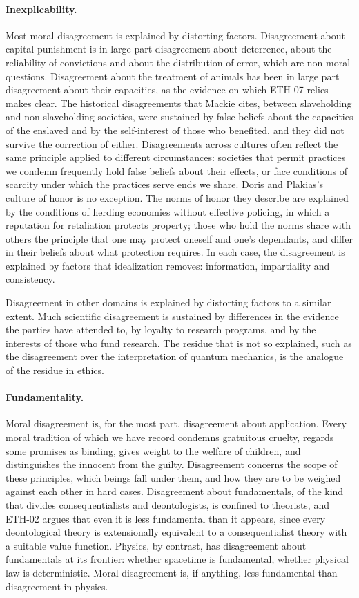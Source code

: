 \documentclass{situationist-preprint}
\begin{document}
\paragraph{Inexplicability.} Most moral disagreement is explained by distorting factors. Disagreement about capital punishment is in large part disagreement about deterrence, about the reliability of convictions and about the distribution of error, which are non-moral questions. Disagreement about the treatment of animals has been in large part disagreement about their capacities, as the evidence on which ETH-07 relies makes clear. The historical disagreements that Mackie cites, between slaveholding and non-slaveholding societies, were sustained by false beliefs about the capacities of the enslaved and by the self-interest of those who benefited, and they did not survive the correction of either. Disagreements across cultures often reflect the same principle applied to different circumstances: societies that permit practices we condemn frequently hold false beliefs about their effects, or face conditions of scarcity under which the practices serve ends we share. Doris and Plakias's culture of honor is no exception. The norms of honor they describe are explained by the conditions of herding economies without effective policing, in which a reputation for retaliation protects property; those who hold the norms share with others the principle that one may protect oneself and one's dependants, and differ in their beliefs about what protection requires. In each case, the disagreement is explained by factors that idealization removes: information, impartiality and consistency.

Disagreement in other domains is explained by distorting factors to a similar extent. Much scientific disagreement is sustained by differences in the evidence the parties have attended to, by loyalty to research programs, and by the interests of those who fund research. The residue that is not so explained, such as the disagreement over the interpretation of quantum mechanics, is the analogue of the residue in ethics.

\paragraph{Fundamentality.} Moral disagreement is, for the most part, disagreement about application. Every moral tradition of which we have record condemns gratuitous cruelty, regards some promises as binding, gives weight to the welfare of children, and distinguishes the innocent from the guilty. Disagreement concerns the scope of these principles, which beings fall under them, and how they are to be weighed against each other in hard cases. Disagreement about fundamentals, of the kind that divides consequentialists and deontologists, is confined to theorists, and ETH-02 argues that even it is less fundamental than it appears, since every deontological theory is extensionally equivalent to a consequentialist theory with a suitable value function. Physics, by contrast, has disagreement about fundamentals at its frontier: whether spacetime is fundamental, whether physical law is deterministic. Moral disagreement is, if anything, less fundamental than disagreement in physics.
\end{document}
